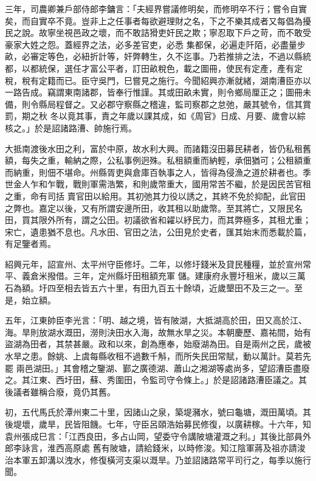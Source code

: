 \begin{pinyinscope}
 三年，司農卿兼戶部侍郎李鏞言：「夫經界嘗議修明矣，而修明卒不行；嘗令自實矣，而自實卒不竟。豈非上之任事者每欲避理財之名，下之不樂其成者又每倡為擾民之說。故寧坐視邑政之壞，而不敢詰猾吏奸民之欺；寧忍取下戶之苛，而不敢受豪家大姓之怨。蓋經界之法，必多差官吏，必悉
 集都保，必遍走阡陌，必盡量步畝，必審定等色，必紐折計等，奸弊轉生，久不迄事。乃若推排之法，不過以縣統都，以都統保，選任才富公平者，訂田畝稅色，載之圖冊，使民有定產，產有定稅，稅有定籍而已。臣守吳門，巳嘗見之施行。今聞紹興亦漸就緒，湖南漕臣亦以一路告成。竊謂東南諸郡，皆奉行惟謹。其或田畝未實，則令鄉局厘正之；圖冊未備，則令縣局程督之。又必郡守察縣之稽違，監司察郡之怠弛，嚴其號令，信其賞罰，期之秋
 冬以竟其事，責之年歲以課其成，如《周官》日成、月要、歲會以綜核之。」於是詔諸路漕、帥施行焉。



 大抵南渡後水田之利，富於中原，故水利大興。而諸籍沒田募民耕者，皆仍私租舊額，每失之重，輸納之際，公私事例迥殊。私租額重而納輕，承佃猶可；公租額重而納重，則佃不堪命。州縣胥吏與倉庫百執事之人，皆得為侵漁之道於耕者也。季世金人乍和乍戰，戰則軍需浩繁，和則歲幣重大，國用常苦不繼，於是因民苦官租之重，命有司括
 賣官田以給用。其初弛其力役以誘之，其終不免於抑配，此官田之弊也。嘉定以後，又有所謂安邊所田，收其租以助歲幣。至其將亡，又限民名田，買其限外所有，謂之公田。初議欲省和糴以紓民力，而其弊極多，其租尤重；宋亡，遺患猶不息也。凡水田、官田之法，公田見於史者，匯其始末而悉載於篇，有足鑒者焉。



 紹興元年，詔宣州、太平州守臣修圩。二年，以修圩錢米及貸民種糧，並於宣州常平、義倉米撥借。三年，定州縣圩田租額充軍
 儲。建康府永豐圩租米，歲以三萬石為額。圩四至相去皆五六十里，有田九百五十餘頃，近歲墾田不及三之一。至是，始立額。



 五年，江東帥臣李光言：「明、越之境，皆有陂湖，大抵湖高於田，田又高於江、海。旱則放湖水溉田，澇則決田水入海，故無水旱之災。本朝慶歷、嘉祐間，始有盜湖為田者，其禁甚嚴。政和以來，創為應奉，始廢湖為田。自是兩州之民，歲被水旱之患。餘姚、上虞每縣收租不過數千斛，而所失民田常賦，動以萬計。莫若先罷
 兩邑湖田。」其會稽之鑒湖、鄞之廣德湖、蕭山之湘湖等處尚多，望詔漕臣盡廢之。其江東、西圩田，蘇、秀圍田，令監司守令條上。」於是詔諸路漕臣議之。其後議者雖稱合廢，竟仍其舊。



 初，五代馬氏於潭州東二十里，因諸山之泉，築堤瀦水，號曰龜塘，溉田萬頃。其後堤壞，歲旱，民皆阻饑。七年，守臣呂頤浩始募民修復，以廣耕稼。十六年，知袁州張成巳言：「江西良田，多占山岡，望委守令講陂塘灌溉之利。」其後比部員外郎李詠言，淮西高原處
 舊有陂塘，請給錢米，以時修浚。知江陰軍蔣及祖亦請浚治本軍五卸溝以洩水，修復橫河支渠以溉旱。乃並詔諸路常平司行之，每季以施行聞。




\end{pinyinscope}
